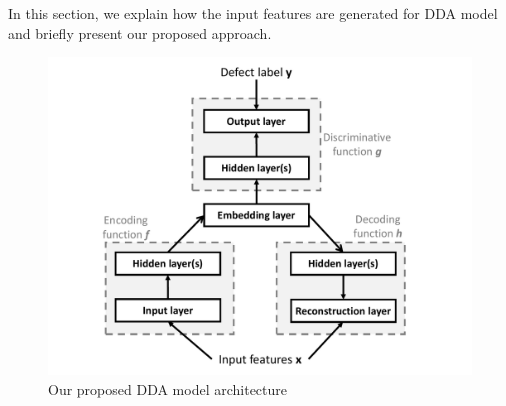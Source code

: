 
In this section, we explain how the input features are generated for DDA model and briefly present our proposed approach.

%
%
\begin{figure}
	\centering
	\includegraphics[width=0.95\columnwidth]{cropped_dda_framework}
	\caption{Our proposed DDA model architecture}
	\label{fig:semi_framework}
\end{figure}
%
%
%

